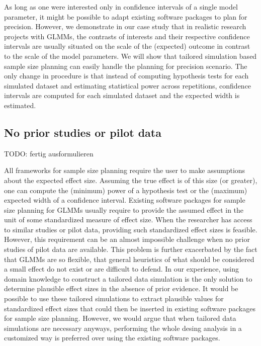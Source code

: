 \documentclass[
  man,floatsintext]{apa6}
\begin{document}
As long as one were interested only in confidence intervals of a single model parameter, it might be possible to adapt existing software packages to plan for precision.
However, we demonstrate in our case study that in realistic research projects with GLMMs, the contrasts of interests and their respective confidence intervals are usually situated on the scale of the (expected) outcome in contrast to the scale of the model parameters.
We will show that tailored simulation based sample size planning can easily handle the planning for precision scenario.
The only change in procedure is that instead of computing hypothesis tests for each simulated dataset and estimating statistical power across repetitions, confidence intervals are computed for each simulated dataset and the expected width is estimated.

\hypertarget{no-prior-studies-or-pilot-data}{%
\subsection{No prior studies or pilot data}\label{no-prior-studies-or-pilot-data}}

TODO: fertig ausformulieren

All frameworks for sample size planning require the user to make assumptions about the expected effect size.
Assuming the true effect is of this size (or greater), one can compute the (minimum) power of a hypothesis test or the (maximum) expected width of a confidence interval.
Existing software packages for sample size planning for GLMMs usually require to provide the assumed effect in the unit of some standardized measure of effect size.
When the researcher has access to similar studies or pilot data, providing such standardized effect sizes is feasible.
However, this requirement can be an almost impossible challenge when no prior studies of pilot data are available.
This problem is further exacerbated by the fact that GLMMs are so flexible, that general heuristics of what should be considered a small effect do not exist or are difficult to defend.
In our experience, using domain knowledge to construct a tailored data simulation is the only solution to determine plausible effect sizes in the absence of prior evidence.
It would be possible to use these tailored simulations to extract plausible values for standardized effect sizes that could then be inserted in existing software packages for sample size planning.
However, we would argue that when tailored data simulations are necessary anyways, performing the whole desing analysis in a customized way is preferred over using the existing software packages.
\end{document}
